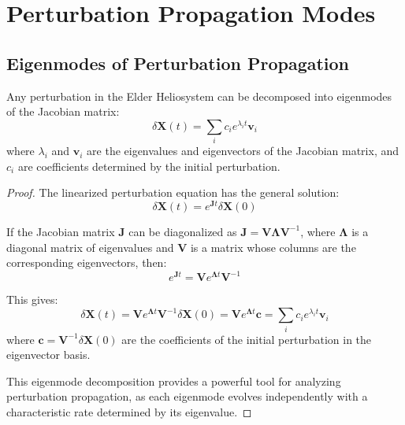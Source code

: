 \section{Perturbation Propagation Modes}

\subsection{Eigenmodes of Perturbation Propagation}

\begin{theorem}
Any perturbation in the Elder Heliosystem can be decomposed into eigenmodes of the Jacobian matrix:
\begin{equation}
\delta\mathbf{X}(t) = \sum_i c_i e^{\lambda_i t} \mathbf{v}_i
\end{equation}
where $\lambda_i$ and $\mathbf{v}_i$ are the eigenvalues and eigenvectors of the Jacobian matrix, and $c_i$ are coefficients determined by the initial perturbation.
\end{theorem}

\begin{proof}
The linearized perturbation equation has the general solution:
\begin{equation}
\delta\mathbf{X}(t) = e^{\mathbf{J}t} \delta\mathbf{X}(0)
\end{equation}

If the Jacobian matrix $\mathbf{J}$ can be diagonalized as $\mathbf{J} = \mathbf{V} \mathbf{\Lambda} \mathbf{V}^{-1}$, where $\mathbf{\Lambda}$ is a diagonal matrix of eigenvalues and $\mathbf{V}$ is a matrix whose columns are the corresponding eigenvectors, then:
\begin{equation}
e^{\mathbf{J}t} = \mathbf{V} e^{\mathbf{\Lambda}t} \mathbf{V}^{-1}
\end{equation}

This gives:
\begin{equation}
\delta\mathbf{X}(t) = \mathbf{V} e^{\mathbf{\Lambda}t} \mathbf{V}^{-1} \delta\mathbf{X}(0) = \mathbf{V} e^{\mathbf{\Lambda}t} \mathbf{c} = \sum_i c_i e^{\lambda_i t} \mathbf{v}_i
\end{equation}
where $\mathbf{c} = \mathbf{V}^{-1} \delta\mathbf{X}(0)$ are the coefficients of the initial perturbation in the eigenvector basis.

This eigenmode decomposition provides a powerful tool for analyzing perturbation propagation, as each eigenmode evolves independently with a characteristic rate determined by its eigenvalue.
\end{proof}

